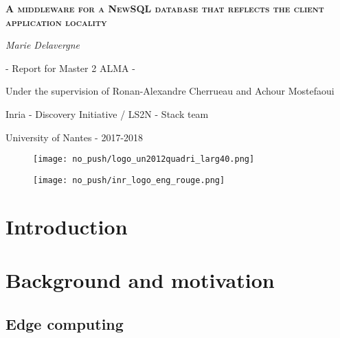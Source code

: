 \documentclass[a4paper, 10pt, titlepage]{report}
\begin{document}
%
\begin{titlepage}
	\centering
	{\scshape\LARGE\bfseries A middleware for a NewSQL database that reflects the client application locality \par}
	\vspace{0cm}
	{\Large\itshape Marie Delavergne\par}
        {\Large - Report for Master 2 ALMA -\par}

	\vfill


        {\large Under the supervision of Ronan-Alexandre Cherrueau and Achour Mostefaoui \par}
        {\large Inria - Discovery Initiative / LS2N - Stack team\par}
	{\large University of Nantes - 2017-2018 \par}

\begin{figure}[!h]\centering
   \begin{minipage}{0.3\textwidth}
     \centerline{\texttt{[image: no\_push/logo\_un2012quadri\_larg40.png]}}
     \label{Fig:univnantes}
   \end{minipage}
   \begin {minipage}{0.3\textwidth}
     \centerline{\texttt{[image: no\_push/inr\_logo\_eng\_rouge.png]}}
     \label{Fig:inria}
   \end{minipage}
\end{figure}



\end{titlepage}


\clearpage
\tableofcontents
\newpage

\section*{Introduction}

\section{Background and motivation}
\subsection{Edge computing}
\end{document}
